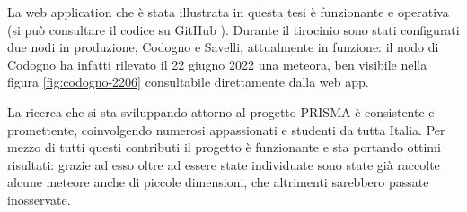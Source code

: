 La web application che è stata illustrata in questa tesi è funzionante e operativa (si può consultare il codice su GitHub \cite{prisma-node-webmin}). Durante il tirocinio sono stati configurati due nodi in produzione, Codogno e Savelli, attualmente in funzione: il nodo di Codogno ha infatti rilevato il 22 giugno 2022 una meteora, ben visibile nella figura \ref{fig:codogno-2206} consultabile direttamente dalla web app.

La ricerca che si sta sviluppando attorno al progetto PRISMA è consistente e promettente, coinvolgendo numerosi appassionati e studenti da tutta Italia. Per mezzo di tutti questi contributi il progetto è funzionante e sta portando ottimi risultati: grazie ad esso oltre ad essere state individuate sono state già raccolte alcune meteore anche di piccole dimensioni, che altrimenti sarebbero passate inosservate.